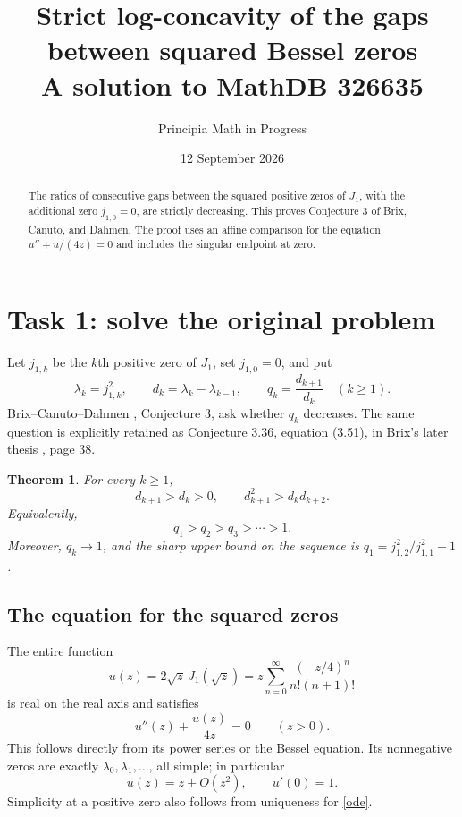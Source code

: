 \documentclass[11pt]{article}
\title{Strict log-concavity of the gaps between squared Bessel zeros\\
\large A solution to MathDB 326635}
\author{Principia Math in Progress}
\date{12 September 2026}
\newtheorem{theorem}{Theorem}
\begin{document}
\maketitle
\begin{abstract}
The ratios of consecutive gaps between the squared positive zeros of $J_1$,
with the additional zero $j_{1,0}=0$, are strictly decreasing. This proves
Conjecture 3 of Brix, Canuto, and Dahmen. The proof uses an affine comparison
for the equation $u''+u/(4z)=0$ and includes the singular endpoint at zero.
\end{abstract}

\section*{Task 1: solve the original problem}
Let $j_{1,k}$ be the $k$th positive zero of $J_1$, set $j_{1,0}=0$, and put
\[
 \lambda_k=j_{1,k}^2,\qquad
 d_k=\lambda_k-\lambda_{k-1},\qquad
 q_k=\frac{d_{k+1}}{d_k}\quad(k\geq1).
\]
Brix--Canuto--Dahmen \cite{BCD}, Conjecture 3, ask whether $q_k$ decreases.
The same question is explicitly retained as Conjecture 3.36, equation
(3.51), in Brix's later thesis \cite{Brix}, page 38.

\begin{theorem}\label{main}
For every $k\geq1$,
\[
 d_{k+1}>d_k>0,\qquad
 d_{k+1}^2>d_kd_{k+2}.
\]
Equivalently,
\[
 q_1>q_2>q_3>\cdots>1.
\]
Moreover, $q_k\to1$, and the sharp upper bound on the sequence is
$q_1=j_{1,2}^2/j_{1,1}^2-1$.
\end{theorem}

\subsection*{The equation for the squared zeros}
The entire function
\[
 u(z)=2\sqrt z\,J_1(\sqrt z)
 =z\sum_{n=0}^{\infty}\frac{(-z/4)^n}{n!(n+1)!}
\]
is real on the real axis and satisfies
\begin{equation}\label{ode}
 u''(z)+\frac{u(z)}{4z}=0\qquad(z>0).
\end{equation}
This follows directly from its power series or the Bessel equation.
Its nonnegative zeros are exactly $\lambda_0,\lambda_1,\ldots$,
all simple; in particular
\[
 u(z)=z+O(z^2),\qquad u'(0)=1.
\]
Simplicity at a positive zero also follows from uniqueness for \eqref{ode}.
\end{document}
